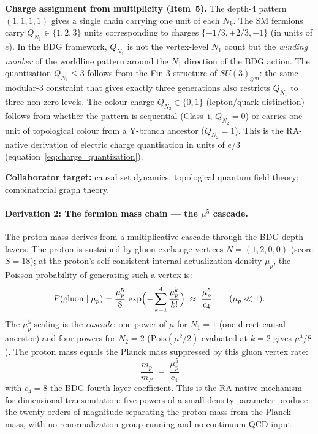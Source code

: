 \documentclass[11pt,a4paper]{article}
\begin{document}
\textbf{Charge assignment from multiplicity (Item~5).}
The depth-4 pattern $(1,1,1,1)$ gives a single chain carrying one unit of
each $N_k$. The SM fermions carry $Q_{N_1} \in \{1,2,3\}$ units corresponding
to charges $\{-1/3, +2/3, -1\}$ (in units of $e$). In the BDG framework,
$Q_{N_1}$ is not the vertex-level $N_1$ count but the \emph{winding number}
of the worldline pattern around the $N_1$ direction of the BDG action. The
quantisation $Q_{N_1} \leq 3$ follows from the Fin-3 structure of
$SU(3)_{\mathrm{gen}}$: the same modular-3 constraint that gives exactly
three generations also restricts $Q_{N_1}$ to three non-zero levels.
The colour charge $Q_{N_2} \in \{0,1\}$ (lepton/quark distinction) follows
from whether the pattern is sequential (Class~i, $Q_{N_2}=0$) or carries
one unit of topological colour from a Y-branch ancestor ($Q_{N_2}=1$).
This is the RA-native derivation of electric charge quantisation in
units of $e/3$ (equation~\eqref{eq:charge_quantization}).

\textbf{Collaborator target:} causal set dynamics; topological quantum field theory;
combinatorial graph theory.

\paragraph{Derivation 2: The fermion mass chain --- the $\mu^5$ cascade.}
\label{par:deriv2}

The proton mass derives from a multiplicative cascade through the BDG depth layers.
The proton is sustained by gluon-exchange vertices $N = (1,2,0,0)$ (score $S = 18$);
at the proton's self-consistent internal actualization density $\mu_p$, the
Poisson probability of generating such a vertex is:
\begin{equation}
  P(\text{gluon} \mid \mu_p)
  = \frac{\mu_p^5}{8}\,\exp\Bigl(-\sum_{k=1}^{4}\frac{\mu_p^k}{k!}\Bigr)
  \;\approx\; \frac{\mu_p^5}{c_4}
  \qquad (\mu_p \ll 1).
  \label{eq:gluon_vertex_prob}
\end{equation}
The $\mu_p^5$ scaling is the \emph{cascade}: one power of $\mu$ for $N_1 = 1$
(one direct causal ancestor) and four powers for $N_2 = 2$
($\mathrm{Pois}(\mu^2/2)$ evaluated at $k=2$ gives $\mu^4/8$).
The proton mass equals the Planck mass suppressed by this gluon vertex rate:
\begin{equation}
  \boxed{\;\frac{m_p}{m_P}
  \;=\; \frac{\mu_p^5}{c_4}\,}
  \label{eq:proton_mass_cascade}
\end{equation}
with $c_4 = 8$ the BDG fourth-layer coefficient. This is the RA-native mechanism
for dimensional transmutation: five powers of a small density parameter produce the
twenty orders of magnitude separating the proton mass from the Planck mass,
with no renormalization group running and no continuum QCD input.
\end{document}
